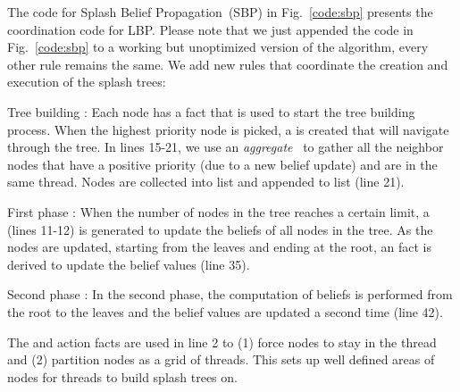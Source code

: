 The code for Splash Belief Propagation~(SBP) in Fig.~\ref{code:sbp} presents the
coordination code for LBP.  Please note that we just appended the code in
Fig.~\ref{code:sbp} to a working but unoptimized version of the algorithm, every
other rule remains the same. We add new rules that coordinate
the creation and execution of the splash trees:

\begin{tightdescription}
   \item[Tree building]: Each node has a  fact that is used to
   start the tree building process. When the highest priority node is picked, a
    is created that will navigate through the tree. In lines 15-21,
   we use an \emph{aggregate}~\cite{cruz-iclp14} to gather all the neighbor
   nodes that have a positive priority (due to a new belief update) and are in the
   same thread. Nodes are collected into list  and
   appended to list  (line 21).
   
   \item[First phase]: When the number of nodes in the tree reaches a certain
   limit, a  (lines 11-12) is generated to update the beliefs of
   all nodes in the tree. As the nodes are updated, starting from the leaves and
   ending at the root, an  fact is derived to update the belief
   values (line 35).

   \item[Second phase]: In the second phase, the computation of beliefs is
   performed from the root to the leaves and the belief values are updated a
   second time (line 42).
\end{tightdescription}

The  and  action facts are used in
line 2 to (1) force nodes to stay in the thread and (2) 
partition nodes as a grid of threads. This sets up well defined areas
of nodes for threads to build splash trees on.

